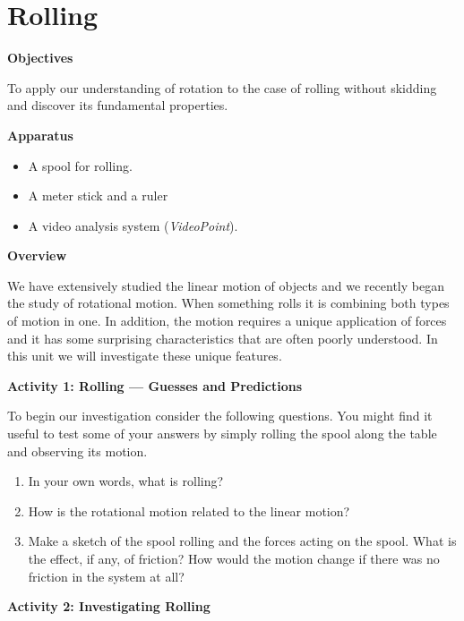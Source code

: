 
\section{Rolling}

\makelabheader %

\textbf{Objectives }

To apply our understanding of rotation to the case of rolling without skidding
and discover its fundamental properties. 

\textbf{Apparatus}

\begin{itemize}
\item A spool for rolling. 
\item A meter stick and a ruler 
\item A video analysis system (\textit{VideoPoint}).
\end{itemize}
\textbf{Overview }

We have extensively studied the linear motion of objects and we recently began
the study of rotational motion. When something rolls it is combining both types
of motion in one. In addition, the motion requires a unique application of forces
and it has some surprising characteristics that are often poorly understood.
In this unit we will investigate these unique features.

\textbf{Activity 1: Rolling --- Guesses and Predictions }

To begin our investigation consider the following questions. You might find
it useful to test some of your answers by simply rolling the spool along the
table and observing its motion.

\begin{enumerate}
\item In your own words, what is rolling?\vspace{20mm}

\item How is the rotational motion related to the linear motion?\vspace{20mm}

\item Make a sketch of the spool rolling and the forces acting on the spool. What
is the effect, if any, of friction? How would the motion change if there was
no friction in the system at all?\vspace{30mm}

\end{enumerate}
\textbf{Activity 2: Investigating Rolling} 

